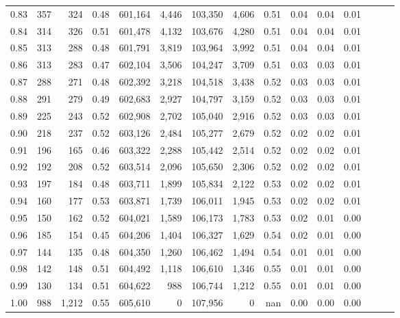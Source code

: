 \begin{tabular}{rrrrrrrrrrrrrrr}
0.83 &     357 &    324 &  0.48 &  601,164 &    4,446 &  103,350 &    4,606 &  0.51 &  0.04 &  0.04 &      0.01 \\
0.84 &     314 &    326 &  0.51 &  601,478 &    4,132 &  103,676 &    4,280 &  0.51 &  0.04 &  0.04 &      0.01 \\
0.85 &     313 &    288 &  0.48 &  601,791 &    3,819 &  103,964 &    3,992 &  0.51 &  0.04 &  0.04 &      0.01 \\
0.86 &     313 &    283 &  0.47 &  602,104 &    3,506 &  104,247 &    3,709 &  0.51 &  0.03 &  0.03 &      0.01 \\
0.87 &     288 &    271 &  0.48 &  602,392 &    3,218 &  104,518 &    3,438 &  0.52 &  0.03 &  0.03 &      0.01 \\
0.88 &     291 &    279 &  0.49 &  602,683 &    2,927 &  104,797 &    3,159 &  0.52 &  0.03 &  0.03 &      0.01 \\
0.89 &     225 &    243 &  0.52 &  602,908 &    2,702 &  105,040 &    2,916 &  0.52 &  0.03 &  0.03 &      0.01 \\
0.90 &     218 &    237 &  0.52 &  603,126 &    2,484 &  105,277 &    2,679 &  0.52 &  0.02 &  0.02 &      0.01 \\
0.91 &     196 &    165 &  0.46 &  603,322 &    2,288 &  105,442 &    2,514 &  0.52 &  0.02 &  0.02 &      0.01 \\
0.92 &     192 &    208 &  0.52 &  603,514 &    2,096 &  105,650 &    2,306 &  0.52 &  0.02 &  0.02 &      0.01 \\
0.93 &     197 &    184 &  0.48 &  603,711 &    1,899 &  105,834 &    2,122 &  0.53 &  0.02 &  0.02 &      0.01 \\
0.94 &     160 &    177 &  0.53 &  603,871 &    1,739 &  106,011 &    1,945 &  0.53 &  0.02 &  0.02 &      0.01 \\
0.95 &     150 &    162 &  0.52 &  604,021 &    1,589 &  106,173 &    1,783 &  0.53 &  0.02 &  0.01 &      0.00 \\
0.96 &     185 &    154 &  0.45 &  604,206 &    1,404 &  106,327 &    1,629 &  0.54 &  0.02 &  0.01 &      0.00 \\
0.97 &     144 &    135 &  0.48 &  604,350 &    1,260 &  106,462 &    1,494 &  0.54 &  0.01 &  0.01 &      0.00 \\
0.98 &     142 &    148 &  0.51 &  604,492 &    1,118 &  106,610 &    1,346 &  0.55 &  0.01 &  0.01 &      0.00 \\
0.99 &     130 &    134 &  0.51 &  604,622 &      988 &  106,744 &    1,212 &  0.55 &  0.01 &  0.01 &      0.00 \\
1.00 &     988 &  1,212 &  0.55 &  605,610 &        0 &  107,956 &        0 &   nan &  0.00 &  0.00 &      0.00 \\
\bottomrule
\end{tabular}
